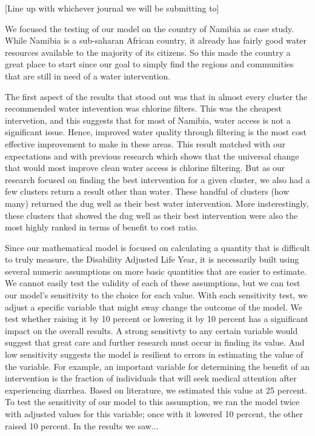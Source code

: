 [Line up with whichever journal we will be submitting to]

We focused the testing of our model on the country of Namibia as case study.
While Namibia is a sub-saharan African country, it already has fairly good water resources available to the majority of its citizens.
So this made the country a great place to start since our goal to simply find the regions and communities that are still in need of a water intervention.  

The first aspect of the results that stood out was that in almost every cluster the recommended water intevention was chlorine filters.
This was the cheapest intervetion, and this suggests that for most of Namibia, water access is not a significant issue.
Hence, improved water quality through filtering is the most cost effective improvement to make in these areas.
This result matched with our expectations and with previous research which shows that the universal change that would most improve clean water access is chlorine filtering.
But as our research focused on finding the best intervention for a given cluster, we also had a few clusters return a result other than water.
These handful of clusters (how many) returned the dug well as their best water intervention.
More insterestingly, these clusters that showed the dug well as their best intervention were also the most highly ranked in terms of benefit to cost ratio.  

Since our mathematical model is focused on calculating a quantity that is difficult to truly measure, the Disability Adjusted Life Year, it is necessarily built using several numeric assumptions on more basic quantities that are easier to estimate.
We cannot easily test the validity of each of these assumptions, but we can test our model's sensitivity to the choice for each value.
With each sensitivity test, we adjust a specific variable that might sway change the outcome of the model.
We test whether raising it by 10 percent or lowering it by 10 percent has a significant impact on the overall results.
A strong sensitivty to any certain variable would suggest that great care and further research must occur in finding its value.
And low sensitivity suggests the model is resilient to errors in estimating the value of the variable.
For example, an important variable for determining the benefit of an intervention is the fraction of individuals that will seek medical attention after experiencing diarrhea.
Based on literature, we estimated this value at 25 percent.
To test the sensitivity of our model to this assumption, we ran the model twice with adjusted values for this variable; once with it lowered 10 percent, the other raised 10 percent.
In the results we saw...  

